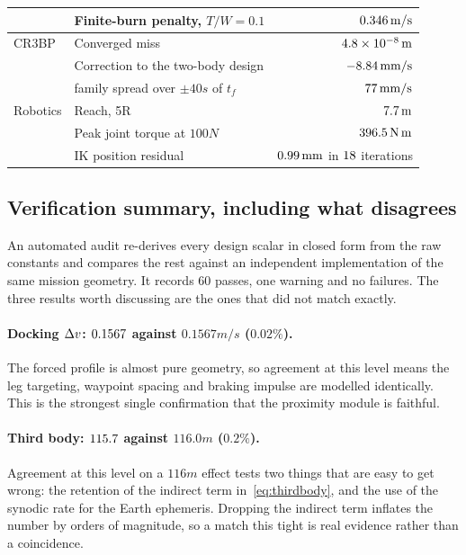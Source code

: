 \begin{table}[htbp]
\begin{tabular}{llr}
           & Finite-burn penalty, $T/W = 0.1$   & $0.346\,\mathrm{m/s}$ \\
\midrule
CR3BP      & Converged miss                     & $4.8\times 10^{-8}\,\mathrm{m}$ \\
           & Correction to the two-body design  & $-8.84\,\mathrm{mm/s}$ \\
           & \quad family spread over $\pm40\unit{s}$ of $t_f$ & $77\,\mathrm{mm/s}$ \\
\midrule
Robotics   & Reach, 5R                          & $7.7\,\mathrm{m}$ \\
           & Peak joint torque at $100\unit{N}$ & $396.5\,\mathrm{N\,m}$ \\
           & IK position residual               & $0.99\,\mathrm{mm}$ in $18$ iterations \\
\bottomrule
\end{tabular}
\end{table}

\subsection{Verification summary, including what disagrees}
\label{sec:discussion:verif}

An automated audit re-derives every design scalar in closed form from the raw
constants and compares the rest against an independent implementation of the
same mission geometry. It records $60$ passes, one warning and no failures. The
three results worth discussing are the ones that did not match exactly.

\paragraph{Docking $\Delta v$: $0.1567$ against $0.1567\unit{m/s}$ ($0.02\%$).}
The forced \vbar{} profile is almost pure geometry, so agreement at this level
means the leg targeting, waypoint spacing and braking impulse are modelled
identically. This is the strongest single confirmation that the proximity module
is faithful.

\paragraph{Third body: $115.7$ against $116.0\unit{m}$ ($0.2\%$).}
Agreement at this level on a $116\unit{m}$ effect tests two things that are easy
to get wrong: the retention of the indirect term in~\eqref{eq:thirdbody}, and
the use of the synodic rate for the Earth ephemeris. Dropping the indirect term
inflates the number by orders of magnitude, so a match this tight is real
evidence rather than a coincidence.

